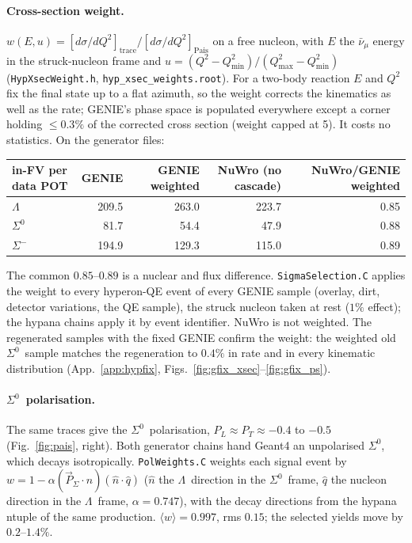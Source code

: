 \documentclass[11pt,a4paper]{article}
\newcommand{\Szero}{\ensuremath{\Sigma^{0}}}
\newcommand{\Lam}{\ensuremath{\Lambda}}
\newcommand{\numubar}{\ensuremath{\bar{\nu}_\mu}}
\begin{document}
\paragraph{Cross-section weight.} $w(E,u)=[d\sigma/dQ^2]_{\mathrm{trace}}/[d\sigma/dQ^2]_
{\mathrm{Pais}}$ on a free nucleon, with $E$ the $\numubar$ energy in the struck-nucleon
frame and $u=(Q^2-Q^2_{\min})/(Q^2_{\max}-Q^2_{\min})$ (\texttt{HypXsecWeight.h},
\texttt{hyp\_xsec\_weights.root}). For a two-body reaction $E$ and $Q^2$ fix the final
state up to a flat azimuth, so the weight corrects the kinematics as well as the rate;
GENIE's phase space is populated everywhere except a corner holding $\leq0.3\%$ of the
corrected cross section (weight capped at 5). It costs no statistics. On the generator
files:
\begin{center}
\small
\begin{tabular}{lrrrr}
\toprule
in-FV per data POT & GENIE & GENIE weighted & NuWro (no cascade) & NuWro/GENIE weighted \\
\midrule
\Lam\      & 209.5 & 263.0 & 223.7 & 0.85 \\
\Szero\    & 81.7  & 54.4  & 47.9  & 0.88 \\
$\Sigma^-$ & 194.9 & 129.3 & 115.0 & 0.89 \\
\bottomrule
\end{tabular}
\end{center}
The common $0.85$--$0.89$ is a nuclear and flux difference. \texttt{SigmaSelection.C}
applies the weight to every hyperon-QE event of every GENIE sample (overlay, dirt,
detector variations, the QE sample), the struck nucleon taken at rest ($1\%$ effect); the
hypana chains apply it by event identifier. NuWro is not weighted. The regenerated samples with the fixed GENIE confirm the weight: the weighted old
\Szero\ sample matches the regeneration to $0.4\%$ in rate and in every kinematic distribution
(App.~\ref{app:hypfix}, Figs.~\ref{fig:gfix_xsec}--\ref{fig:gfix_ps}).

\paragraph{\Szero\ polarisation.} The same traces give the \Szero\ polarisation,
$P_L\approx P_T\approx-0.4$ to $-0.5$ (Fig.~\ref{fig:pais}, right). Both generator chains
hand Geant4 an unpolarised \Szero, which decays isotropically. \texttt{PolWeights.C}
weights each signal event by $w=1-\alpha(\vec P_\Sigma\cdot\hat n)(\hat n\cdot\hat q)$
($\hat n$ the \Lam\ direction in the \Szero\ frame, $\hat q$ the nucleon direction in the
\Lam\ frame, $\alpha=0.747$), with the decay directions from the hypana ntuple of the same
production. $\langle w\rangle=0.997$, rms $0.15$; the selected yields move by $0.2$--$1.4\%$.
\end{document}
